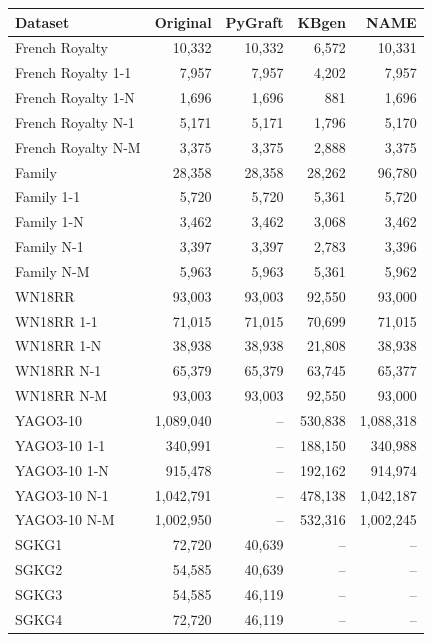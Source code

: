 \begin{tabular}{lrrrr}
\toprule
Dataset & Original & PyGraft & KBgen & NAME \\
\midrule
French Royalty & 10{,}332 & 10{,}332 & 6{,}572 & 10{,}331 \\
French Royalty 1-1 & 7{,}957 & 7{,}957 & 4{,}202 & 7{,}957 \\
French Royalty 1-N & 1{,}696 & 1{,}696 & 881 & 1{,}696 \\
French Royalty N-1 & 5{,}171 & 5{,}171 & 1{,}796 & 5{,}170 \\
French Royalty N-M & 3{,}375 & 3{,}375 & 2{,}888 & 3{,}375 \\
\midrule
Family & 28{,}358 & 28{,}358 & 28{,}262 & 96{,}780 \\
Family 1-1 & 5{,}720 & 5{,}720 & 5{,}361 & 5{,}720 \\
Family 1-N & 3{,}462 & 3{,}462 & 3{,}068 & 3{,}462 \\
Family N-1 & 3{,}397 & 3{,}397 & 2{,}783 & 3{,}396 \\
Family N-M & 5{,}963 & 5{,}963 & 5{,}361 & 5{,}962 \\
\midrule
WN18RR & 93{,}003 & 93{,}003 & 92{,}550 & 93{,}000 \\
WN18RR 1-1 & 71{,}015 & 71{,}015 & 70{,}699 & 71{,}015 \\
WN18RR 1-N & 38{,}938 & 38{,}938 & 21{,}808 & 38{,}938 \\
WN18RR N-1 & 65{,}379 & 65{,}379 & 63{,}745 & 65{,}377 \\
WN18RR N-M & 93{,}003 & 93{,}003 & 92{,}550 & 93{,}000 \\
\midrule
YAGO3-10 & 1{,}089{,}040 & – & 530{,}838 & 1{,}088{,}318 \\
YAGO3-10 1-1 & 340{,}991 & – & 188{,}150 & 340{,}988 \\
YAGO3-10 1-N & 915{,}478 & – & 192{,}162 & 914{,}974 \\
YAGO3-10 N-1 & 1{,}042{,}791 & – & 478{,}138 & 1{,}042{,}187 \\
YAGO3-10 N-M & 1{,}002{,}950 & – & 532{,}316 & 1{,}002{,}245 \\
\midrule
SGKG1 & 72{,}720 & 40{,}639 & – & – \\
SGKG2 & 54{,}585 & 40{,}639 & – & – \\
SGKG3 & 54{,}585 & 46{,}119 & – & – \\
SGKG4 & 72{,}720 & 46{,}119 & – & – \\
\bottomrule
\end{tabular}
